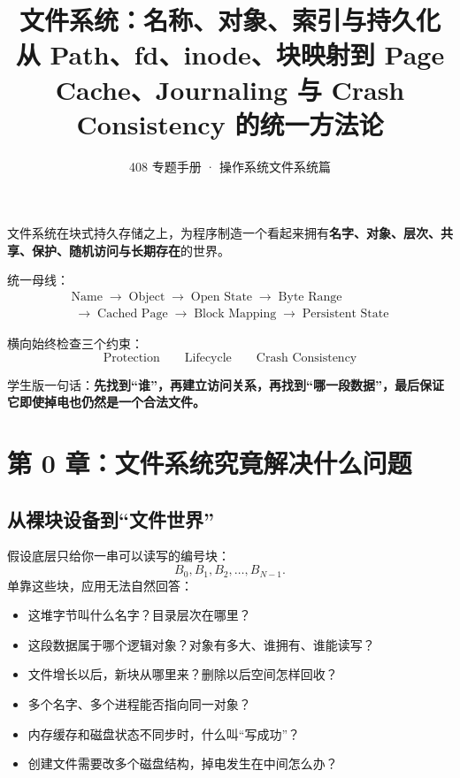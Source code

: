 \documentclass[11pt,a4paper]{ctexart}
\title{\vspace{-1.2cm}\textbf{文件系统：名称、对象、索引与持久化}\\[0.35em]
\large 从 Path、fd、inode、块映射到 Page Cache、Journaling 与 Crash Consistency 的统一方法论}
\author{408 专题手册 · 操作系统文件系统篇}
\date{}
\newcommand{\kw}[1]{\textbf{#1}}
\newcommand{\arr}{\;\longrightarrow\;}
\begin{document}
\maketitle

\begin{corebox}
文件系统在块式持久存储之上，为程序制造一个看起来拥有\kw{名字、对象、层次、共享、保护、随机访问与长期存在}的世界。

统一母线：
\[
\boxed{\begin{aligned}
\text{Name}\arr\text{Object}\arr\text{Open State}\arr\text{Byte Range}\\
\arr\text{Cached Page}\arr\text{Block Mapping}\arr\text{Persistent State}
\end{aligned}}
\]

横向始终检查三个约束：
\[
\boxed{\text{Protection}}\qquad
\boxed{\text{Lifecycle}}\qquad
\boxed{\text{Crash Consistency}}
\]

学生版一句话：\kw{先找到“谁”，再建立访问关系，再找到“哪一段数据”，最后保证它即使掉电也仍然是一个合法文件。}
\end{corebox}

\tableofcontents
\newpage

\section{第 0 章：文件系统究竟解决什么问题}

\subsection{从裸块设备到“文件世界”}
假设底层只给你一串可以读写的编号块：
\[
B_0,B_1,B_2,\ldots,B_{N-1}.
\]
单靠这些块，应用无法自然回答：
\begin{itemize}
  \item 这堆字节叫什么名字？目录层次在哪里？
  \item 这段数据属于哪个逻辑对象？对象有多大、谁拥有、谁能读写？
  \item 文件增长以后，新块从哪里来？删除以后空间怎样回收？
  \item 多个名字、多个进程能否指向同一对象？
  \item 内存缓存和磁盘状态不同步时，什么叫“写成功”？
  \item 创建文件需要改多个磁盘结构，掉电发生在中间怎么办？
\end{itemize}
\end{document}

